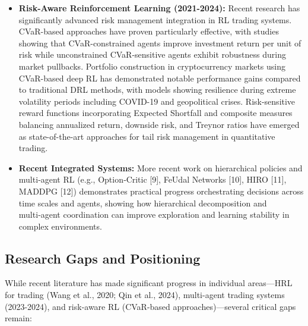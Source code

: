 \documentclass[11pt,a4paper]{article}
\begin{document}
\begin{itemize}
\item   \textbf{Risk-Aware Reinforcement Learning (2021-2024):} Recent research has significantly advanced risk management integration in RL trading systems. CVaR-based approaches have proven particularly effective, with studies showing that CVaR-constrained agents improve investment return per unit of risk while unconstrained CVaR-sensitive agents exhibit robustness during market pullbacks. Portfolio construction in cryptocurrency markets using CVaR-based deep RL has demonstrated notable performance gains compared to traditional DRL methods, with models showing resilience during extreme volatility periods including COVID-19 and geopolitical crises. Risk-sensitive reward functions incorporating Expected Shortfall and composite measures balancing annualized return, downside risk, and Treynor ratios have emerged as state-of-the-art approaches for tail risk management in quantitative trading.

\item   \textbf{Recent Integrated Systems:} More recent work on hierarchical policies and multi‑agent RL (e.g., Option‑Critic [9], FeUdal Networks [10], HIRO [11], MADDPG [12]) demonstrates practical progress orchestrating decisions across time scales and agents, showing how hierarchical decomposition and multi‑agent coordination can improve exploration and learning stability in complex environments.

\end{itemize}
\subsection{Research Gaps and Positioning}

While recent literature has made significant progress in individual areas—HRL for trading (Wang et al., 2020; Qin et al., 2024), multi-agent trading systems (2023-2024), and risk-aware RL (CVaR-based approaches)—several critical gaps remain:
\end{document}
